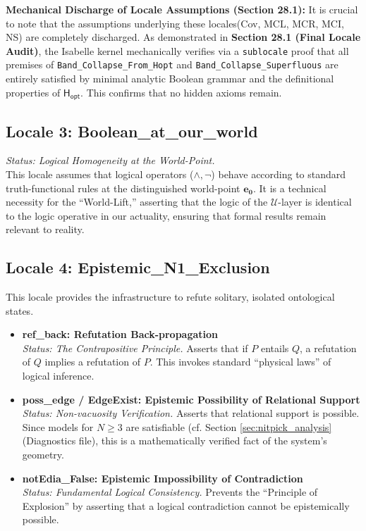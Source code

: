 \documentclass[a4paper, 11pt]{article}
\theoremstyle{plain}
\theoremstyle{definition}
\newcommand{\U}{\mathcal{U}}               %
\newcommand{\Hopt}{\mathsf{H_{opt}}}       %
\newcommand{\eZero}{\mathbf{e_0}}         %
\begin{document}
\vspace{0.5em}
\noindent \textbf{Mechanical Discharge of Locale Assumptions (Section 28.1):}
It is crucial to note that the assumptions underlying these locales(Cov, MCL, MCR, MCI, NS) are completely discharged. As demonstrated in \textbf{Section 28.1 (Final Locale Audit)}, the Isabelle kernel mechanically verifies via a \texttt{sublocale} proof that all premises of \texttt{Band\_Collapse\_From\_Hopt} and \texttt{Band\_Collapse\_Superfluous} are entirely satisfied by minimal analytic Boolean grammar and the definitional properties of $\Hopt$. This confirms that no hidden axioms remain.

\subsection{Locale 3: Boolean\_at\_our\_world}
\textit{Status: Logical Homogeneity at the World-Point.} \\
This locale assumes that logical operators ($\wedge, \neg$) behave according to standard truth-functional rules at the distinguished world-point $\eZero$. It is a technical necessity for the ``World-Lift,'' asserting that the logic of the $\U$-layer is identical to the logic operative in our actuality, ensuring that formal results remain relevant to reality.

\subsection{Locale 4: Epistemic\_N1\_Exclusion}
This locale provides the infrastructure to refute solitary, isolated ontological states.

\begin{itemize}
    \item \textbf{ref\_back: Refutation Back-propagation} \\
    \textit{Status: The Contrapositive Principle.} Asserts that if $P$ entails $Q$, a refutation of $Q$ implies a refutation of $P$. This invokes standard ``physical laws'' of logical inference.
   
    \item \textbf{poss\_edge / EdgeExist: Epistemic Possibility of Relational Support} \\
    \textit{Status: Non-vacuosity Verification.} Asserts that relational support is possible. Since models for $N \ge 3$ are satisfiable (cf. Section \ref{sec:nitpick_analysis}(Diagnostics file), this is a mathematically verified fact of the system's geometry.
   
    \item \textbf{notEdia\_False: Epistemic Impossibility of Contradiction} \\
    \textit{Status: Fundamental Logical Consistency.} Prevents the ``Principle of Explosion'' by asserting that a logical contradiction cannot be epistemically possible.
\end{itemize}
\end{document}
